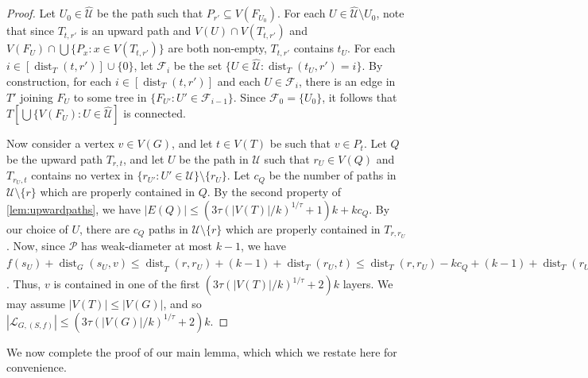 \documentclass[11pt]{article}
\renewcommand{\leq}{\leqslant}
\DeclareMathOperator{\dist}{dist}
\theoremstyle{plain}
\theoremstyle{definition}
\newcommand{\PP}{\mathcal{P}}
\begin{document}
\begin{proof}
			Let $U_0\in \hat{\mathcal{U}}$ be the path such that $P_{r'}\subseteq V(F_{U_0})$.
			For each $U\in \hat{\mathcal{U}}\setminus U_0$, note that since $T_{t,r'}$ is an upward path and $V(U)\cap V(T_{t,r'})$ and $V(F_U)\cap \bigcup \{P_x:x\in V(T_{t,r'})\}$ are both non-empty, $T_{t,r'}$ contains $t_U$.
			For each $i\in [\dist_T(t,r')]\cup \{0\}$, let $\mathcal{F}_i$ be the set $\{U\in \hat{\mathcal{U}}:\dist_T(t_U,r')=i\}$.
			By construction, for each $i\in [\dist_T(t,r')]$ and each $U\in \mathcal{F}_i$, there is an edge in $T'$ joining $F_U$ to some tree in $\{F_{U'}:U'\in \mathcal{F}_{i-1}\}$.
			Since $\mathcal{F}_0=\{U_0\}$, it follows that $T[\bigcup \{V(F_U):U\in \hat{\mathcal{U}}]$ is connected.
			
			Now consider a vertex $v\in V(G)$, and let $t\in V(T)$ be such that $v\in P_t$.
			Let $Q$ be the upward path $T_{r,t}$, and let $U$ be the path in $\mathcal{U}$ such that $r_U\in V(Q)$ and $T_{r_U,t}$ contains no vertex in $\{r_{U'}:U'\in \mathcal{U}\}\setminus \{r_U\}$.
			Let $c_Q$ be the number of paths in $\mathcal{U}\setminus \{r\}$ which are properly contained in $Q$.
			By the second property of \cref{lem:upwardpaths}, we have $|E(Q)|\leq (3\tau(|V(T)|/k)^{1/\tau}+1)k+kc_Q$.
			By our choice of $U$, there are $c_Q$ paths in $\mathcal{U}\setminus \{r\}$ which are properly contained in $T_{r,r_U}$.
			Now, since $\PP$ has weak-diameter at most $k-1$, we have $f(s_U)+\dist_G(s_U,v)\leq \dist_{\hat{T}}(r,r_U)+(k-1)+\dist_T(r_U,t)\leq \dist_T(r,r_U)-kc_Q+(k-1)+\dist_T(r_U,t)=|E(Q)|-kc_Q+k-1\leq (3\tau(|V(T)|/k)^{1/\tau}+2)k-1$.
			Thus, $v$ is contained in one of the first $(3\tau(|V(T)|/k)^{1/\tau}+2)k$ layers.
			We may assume $|V(T)|\leq |V(G)|$, and so $|\mathcal{L}_{G,(S,f)}|\leq(3\tau(|V(G)|/k)^{1/\tau}+2)k$.
		\end{proof}
		
		We now complete the proof of our main lemma, which which we restate here for convenience.
		\MainLemName*
		
\end{document}
